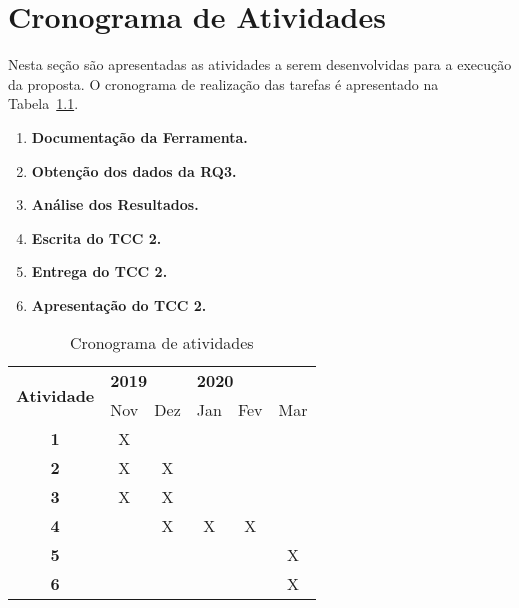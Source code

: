 \chapter{Cronograma de Atividades}
\label{cap:cronograma}

Nesta seção são apresentadas as atividades a serem desenvolvidas para a execução da proposta. O cronograma de realização das tarefas é apresentado na Tabela~\ref{tab:cronograma}.

\begin{enumerate}
\item \textbf{Documentação da Ferramenta.}
\item \textbf{Obtenção dos dados da RQ3.}
\item \textbf{Análise dos Resultados.}
\item \textbf{Escrita do TCC 2.}
\item \textbf{Entrega do TCC 2.}
\item \textbf{Apresentação do TCC 2.}
\end{enumerate}

\begin{table}[h!]
\centering
\renewcommand{\arraystretch}{1.3}
\caption{Cronograma de atividades}
\label{tab:cronograma}
\begin{tabular}{|c|c|c|c|c|c|}
\hline
\multirow{2}{*}{\textbf{Atividade}} & \multicolumn{2}{l|}{\textbf{2019}} & \multicolumn{3}{l|}{\textbf{2020}} \\ \cline{2-6} 
             & Nov & Dez & Jan & Fev & Mar \\ \hline
\textbf{1}   &  X  &     &     &     &     \\ \hline
\textbf{2}   &  X  &  X  &     &     &     \\ \hline
\textbf{3}   &  X  &  X  &     &     &     \\ \hline
\textbf{4}   &     &  X  &  X  &  X  &     \\ \hline
\textbf{5}   &     &     &     &     &  X  \\ \hline
\textbf{6}   &     &     &     &     &  X  \\ \hline
\end{tabular}
\end{table}
